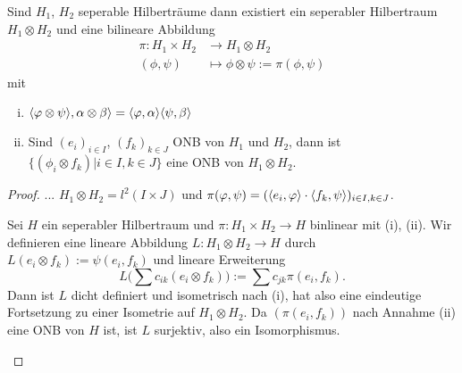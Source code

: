 \documentclass{mycourse}
\begin{document}
\begin{st}\label{8.3}
Sind $H_1$, $H_2$ seperable Hilberträume dann existiert ein seperabler Hilbertraum $H_1\otimes H_2$ und eine bilineare Abbildung
\begin{align*}
\pi: H_1 \times H_2 &\to H_1 \otimes H_2\\
(\phi, \psi) &\mapsto \phi \otimes \psi:= \pi(\phi, \psi) 
\end{align*}
mit
\begin{enumerate}[(i)]
\item $\langle \varphi \otimes \psi\rangle, \alpha \otimes \beta\rangle = \langle \varphi, \alpha \rangle \langle \psi, \beta \rangle$
\item Sind $(e_i)_{i\in I}$, $(f_k)_{k\in J}$ ONB von $H_1$ und $H_2$, dann ist $\{(\phi_i \otimes f_k) | i\in I, k\in J\}$ eine ONB von $H_1 \otimes H_2$.
\end{enumerate}
\end{st}
\begin{proof}
\fixme... $H_1 \otimes H_2 = l^2(I\times J)$ und $\pi(\varphi, \psi)=(\langle e_i, \varphi \rangle \cdot \langle f_k, \psi\rangle)_{i\in I, k\in J}$.
\begin{seg}[Eindeutigkeit]
Sei $H$ ein seperabler Hilbertraum und $\pi:H_1 \times H_2 \to H$ binlinear mit (i), (ii). Wir definieren eine lineare Abbildung $L: H_1 \otimes H_2 \to H$ durch $
L(e_i \otimes f_k) := \psi(e_i, f_k)
$
und lineare Erweiterung
\[
L\big (\sum c_{ik} (e_i \otimes f_k)\big) := \sum c_{jk} \pi(e_i, f_k).
\]
Dann ist $L$ dicht definiert und isometrisch nach (i), hat also eine eindeutige Fortsetzung zu einer Isometrie auf $H_1 \otimes H_2$. Da $(\pi(e_i, f_k))$ nach Annahme (ii) eine ONB von $H$ ist, ist $L$ surjektiv, also ein Isomorphismus. 
\end{seg}
\end{proof}
\end{document}
